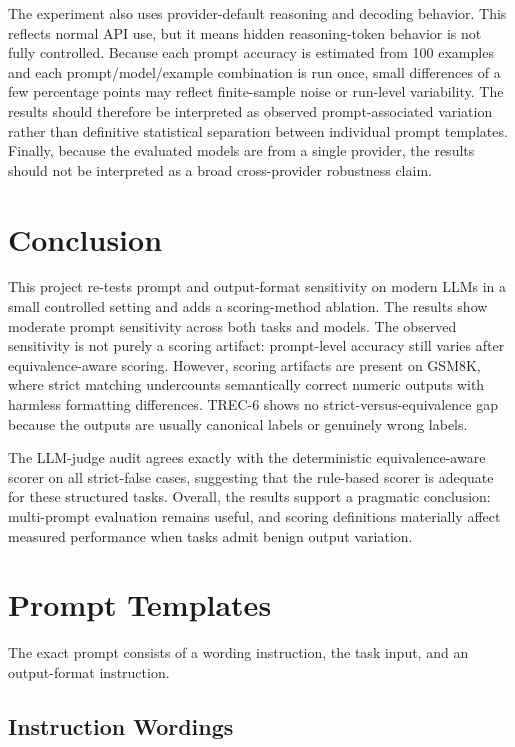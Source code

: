 \documentclass[11pt]{article}
\begin{document}
The experiment also uses provider-default reasoning and decoding behavior. This reflects normal API use, but it means hidden reasoning-token behavior is not fully controlled. Because each prompt accuracy is estimated from 100 examples and each prompt/model/example combination is run once, small differences of a few percentage points may reflect finite-sample noise or run-level variability. The results should therefore be interpreted as observed prompt-associated variation rather than definitive statistical separation between individual prompt templates. Finally, because the evaluated models are from a single provider, the results should not be interpreted as a broad cross-provider robustness claim.

\section{Conclusion}

This project re-tests prompt and output-format sensitivity on modern LLMs in a small controlled setting and adds a scoring-method ablation. The results show moderate prompt sensitivity across both tasks and models. The observed sensitivity is not purely a scoring artifact: prompt-level accuracy still varies after equivalence-aware scoring. However, scoring artifacts are present on GSM8K, where strict matching undercounts semantically correct numeric outputs with harmless formatting differences. TREC-6 shows no strict-versus-equivalence gap because the outputs are usually canonical labels or genuinely wrong labels.

The LLM-judge audit agrees exactly with the deterministic equivalence-aware scorer on all strict-false cases, suggesting that the rule-based scorer is adequate for these structured tasks. Overall, the results support a pragmatic conclusion: multi-prompt evaluation remains useful, and scoring definitions materially affect measured performance when tasks admit benign output variation.

\appendix

\section{Prompt Templates}

The exact prompt consists of a wording instruction, the task input, and an output-format instruction.

\subsection{Instruction Wordings}
\end{document}
